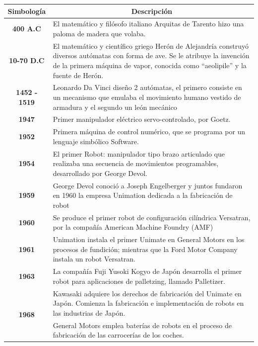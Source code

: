 \begin{table}[H]
    \centering
    \begin{tabular}{|c|m{12cm}|}
    \hline
        \textbf{Simbología}  & \multicolumn{1}{c|}{\textbf{Descripción}}  \\\hline
         \textbf{400 A.C} & El matemático y filósofo italiano Arquitas de Tarento hizo una paloma de madera que volaba. \\ \hline
         \textbf{10-70 D.C} & El matemático y científico griego Herón de Alejandría construyó diversos autómatas con forma de ave. Se le atribuye la invención de la primera máquina de vapor, conocida como “aeolipile” y la fuente de Herón. \\ \hline
         \textbf{1452 - 1519} & Leonardo Da Vinci diseño 2 autómatas, el primero consiste en un mecanismo que emulaba el movimiento humano vestido de armadura y el segundo un león mecánico \\ \hline
         \textbf{1947} & Primer manipulador eléctrico servo-controlado, por Goetz. \\ \hline
         \textbf{1952} & Primera máquina de control numérico, que se programa por un lenguaje simbólico Software. \\ \hline
         \textbf{1954} & El primer Robot: manipulador tipo brazo articulado que realizaba una secuencia de movimientos programables, desarrollado por George Devol. \\ \hline
         \textbf{1959} & George Devol conoció a Joseph Engelberger y juntos fundaron en 1960 la empresa Unimation dedicada a la fabricación de robot \\ \hline
         \textbf{1960} & Se produce el primer robot de configuración cilíndrica Versatran, por la compañía American Machine Foundry (AMF) \\ \hline
         \textbf{1961} & Unimation instala el primer Unimate en General Motors en los procesos de fundición; mientras que la Ford Motor Company instala un robot Versatran. \\ \hline
         \textbf{1963} & La compañía Fuji Yusoki Kogyo de Japón desarrolla el primer robot para aplicaciones de palletzing, llamado Palletizer. \\ \hline
         \multirow{2}{*}{\textbf{1968}} & Kawasaki adquiere los derechos de fabricación del Unimate en Japón. Comienza la fabricación e implementación de robots en las industrias de Japón. \\ \hline
          & General Motors emplea baterías de robots en el proceso de fabricación de las carrocerías de los coches.\\ \hline

\end{tabular}
\end{table}
